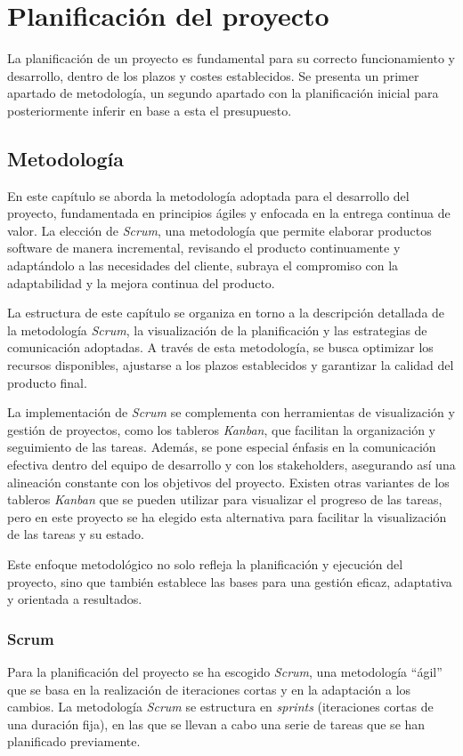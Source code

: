 \chapter{Planificación del proyecto}\label{chap:planif}
La planificación de un proyecto es fundamental para su correcto funcionamiento y
desarrollo, dentro de los plazos y costes establecidos. Se presenta un primer
apartado de metodología, un segundo apartado con la planificación inicial para
posteriormente inferir en base a esta el presupuesto.


\section{Metodología}\label{sec:metodología}
En este capítulo se aborda la metodología adoptada para el desarrollo del
proyecto, fundamentada en principios ágiles y enfocada en la entrega continua de
valor. La elección de \textit{Scrum}, una metodología que permite elaborar
productos software de manera incremental, revisando el producto continuamente y
adaptándolo a las necesidades del cliente, subraya el compromiso con la
adaptabilidad y la mejora continua del producto.

La estructura de este capítulo se organiza en torno a la descripción detallada
de la metodología \textit{Scrum}, la visualización de la planificación y las
estrategias de comunicación adoptadas. A través de esta metodología, se busca
optimizar los recursos disponibles, ajustarse a los plazos establecidos y
garantizar la calidad del producto final.

La implementación de \textit{Scrum} se complementa con herramientas de
visualización y gestión de proyectos, como los tableros \textit{Kanban}, que
facilitan la organización y seguimiento de las tareas. Además, se pone especial
énfasis en la comunicación efectiva dentro del equipo de desarrollo y con los
stakeholders, asegurando así una alineación constante con los objetivos del
proyecto. Existen otras variantes de los tableros \textit{Kanban} que se pueden
utilizar para visualizar el progreso de las tareas, pero en este proyecto se ha
elegido esta alternativa para facilitar la visualización de las tareas y su
estado.

Este enfoque metodológico no solo refleja la planificación y ejecución del
proyecto, sino que también establece las bases para una gestión eficaz,
adaptativa y orientada a resultados.

\newpage{}
\subsection{Scrum}\label{subsec:scrum}
Para la planificación del proyecto se ha escogido \textit{Scrum}, una
metodología ``ágil'' que se basa en la realización de iteraciones cortas y en la
adaptación a los cambios. La metodología \textit{Scrum} se estructura en
\textit{sprints} (iteraciones cortas de una duración fija), en las que se llevan
a cabo una serie de tareas que se han planificado previamente.

